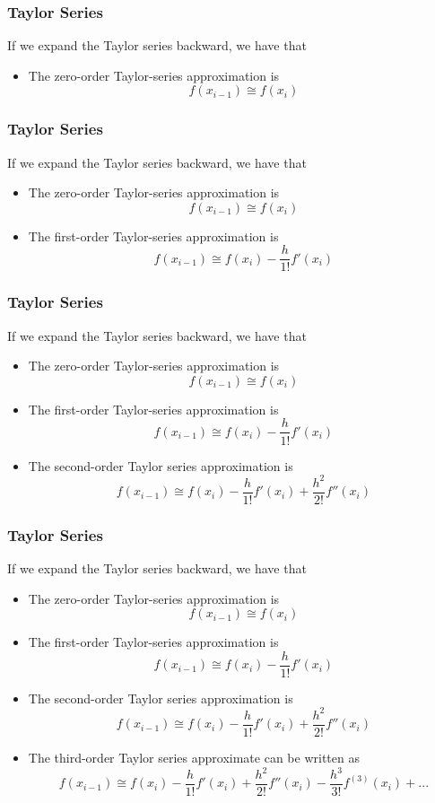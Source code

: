 \documentclass{if-beamer}
\begin{document}

\begin{frame}[t]
\frametitle{Taylor Series}

If we expand the Taylor series backward, we have that 
\begin{itemize}
	\item 	The zero-order Taylor-series approximation is
	$$f(x_{i-1}) \cong f(x_i) $$
\end{itemize}	

\end{frame}

\begin{frame}[t]
\frametitle{Taylor Series}

If we expand the Taylor series backward, we have that 
\begin{itemize}
	\item 	The zero-order Taylor-series approximation is
	$$f(x_{i-1}) \cong f(x_i) $$
	\item The first-order Taylor-series approximation is
	$$f(x_{i-1}) \cong f(x_i) -\frac{h}{1!}f'(x_i) $$
\end{itemize}	

\end{frame}

\begin{frame}[t]
\frametitle{Taylor Series}

If we expand the Taylor series backward, we have that 
\begin{itemize}
	\item 	The zero-order Taylor-series approximation is
	$$f(x_{i-1}) \cong f(x_i) $$
	\item The first-order Taylor-series approximation is
	$$f(x_{i-1}) \cong f(x_i) -\frac{h}{1!}f'(x_i) $$
	\item The second-order Taylor series approximation is 
	$$f(x_{i-1}) \cong f(x_i) -\frac{h}{1!}f'(x_i) + \frac{h^2}{2!}f''(x_i)$$
\end{itemize}	

\end{frame}

\begin{frame}[t]
\frametitle{Taylor Series}

If we expand the Taylor series backward, we have that 
\begin{itemize}
	\item 	The zero-order Taylor-series approximation is
	$$f(x_{i-1}) \cong f(x_i) $$
	\item The first-order Taylor-series approximation is
	$$f(x_{i-1}) \cong f(x_i) -\frac{h}{1!}f'(x_i) $$
	\item The second-order Taylor series approximation is 
	$$f(x_{i-1}) \cong f(x_i) -\frac{h}{1!}f'(x_i) + \frac{h^2}{2!}f''(x_i)$$
	\item The third-order Taylor series approximate can be written as
	$$f(x_{i-1}) \cong f(x_i) - \frac{h}{1!}f'(x_i) + \frac{h^2}{2!}f''(x_i)-\frac{h^3}{3!}f^{(3)}(x_i)+...$$
\end{itemize}	

\end{frame}
\end{document}
